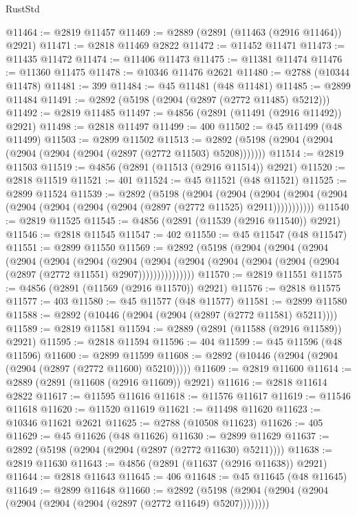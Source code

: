 \begin{lexlean}{RustStd}
\begin{coremodule}
@11464 := @2819 @11457
@11469 := @2889 (@2891 (@11463 (@2916 @11464)) @2921)
@11471 := @2818 @11469 @2822
@11472 := @11452 @11471
@11473 := @11435 @11472
@11474 := @11406 @11473
@11475 := @11381 @11474
@11476 := @11360 @11475
@11478 := @10346 @11476 @2621
@11480 := @2788 (@10344 @11478)
@11481 := 399
@11484 := @45 @11481 (@48 @11481)
@11485 := @2899 @11484
@11491 := @2892 (@5198 (@2904 (@2897 (@2772 @11485) @5212)))
@11492 := @2819 @11485
@11497 := @4856 (@2891 (@11491 (@2916 @11492)) @2921)
@11498 := @2818 @11497
@11499 := 400
@11502 := @45 @11499 (@48 @11499)
@11503 := @2899 @11502
@11513 := @2892 (@5198 (@2904 (@2904 (@2904 (@2904 (@2904 (@2897 (@2772 @11503) @5208)))))))
@11514 := @2819 @11503
@11519 := @4856 (@2891 (@11513 (@2916 @11514)) @2921)
@11520 := @2818 @11519
@11521 := 401
@11524 := @45 @11521 (@48 @11521)
@11525 := @2899 @11524
@11539 := @2892
    (@5198
      (@2904
        (@2904
          (@2904 (@2904 (@2904 (@2904 (@2904 (@2904 (@2904 (@2897 (@2772 @11525) @2911)))))))))))
@11540 := @2819 @11525
@11545 := @4856 (@2891 (@11539 (@2916 @11540)) @2921)
@11546 := @2818 @11545
@11547 := 402
@11550 := @45 @11547 (@48 @11547)
@11551 := @2899 @11550
@11569 := @2892
    (@5198
      (@2904
        (@2904
          (@2904
            (@2904
              (@2904
                (@2904
                  (@2904
                    (@2904
                      (@2904 (@2904 (@2904 (@2904 (@2904 (@2897 (@2772 @11551) @2907)))))))))))))))
@11570 := @2819 @11551
@11575 := @4856 (@2891 (@11569 (@2916 @11570)) @2921)
@11576 := @2818 @11575
@11577 := 403
@11580 := @45 @11577 (@48 @11577)
@11581 := @2899 @11580
@11588 := @2892 (@10446 (@2904 (@2904 (@2897 (@2772 @11581) @5211))))
@11589 := @2819 @11581
@11594 := @2889 (@2891 (@11588 (@2916 @11589)) @2921)
@11595 := @2818 @11594
@11596 := 404
@11599 := @45 @11596 (@48 @11596)
@11600 := @2899 @11599
@11608 := @2892 (@10446 (@2904 (@2904 (@2904 (@2897 (@2772 @11600) @5210)))))
@11609 := @2819 @11600
@11614 := @2889 (@2891 (@11608 (@2916 @11609)) @2921)
@11616 := @2818 @11614 @2822
@11617 := @11595 @11616
@11618 := @11576 @11617
@11619 := @11546 @11618
@11620 := @11520 @11619
@11621 := @11498 @11620
@11623 := @10346 @11621 @2621
@11625 := @2788 (@10508 @11623)
@11626 := 405
@11629 := @45 @11626 (@48 @11626)
@11630 := @2899 @11629
@11637 := @2892 (@5198 (@2904 (@2904 (@2897 (@2772 @11630) @5211))))
@11638 := @2819 @11630
@11643 := @4856 (@2891 (@11637 (@2916 @11638)) @2921)
@11644 := @2818 @11643
@11645 := 406
@11648 := @45 @11645 (@48 @11645)
@11649 := @2899 @11648
@11660 := @2892 (@5198 (@2904 (@2904 (@2904 (@2904 (@2904 (@2904 (@2897 (@2772 @11649) @5207))))))))

\end{coremodule}
\end{lexlean}
